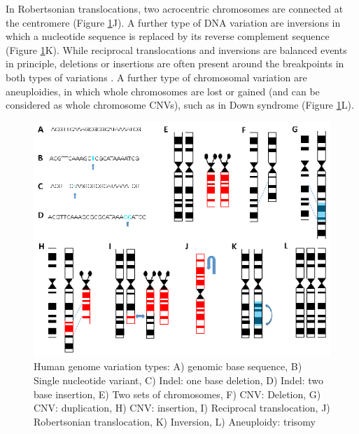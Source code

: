 In Robertsonian translocations, two acrocentric chromosomes are connected at the centromere \cite{Robertson_1916} (Figure \ref{fig:Introduction_Fig1}J). 
A further type of DNA variation are inversions in which a nucleotide sequence is replaced by its reverse complement sequence \cite{Sudmant_2015,den_Dunnen_2016} (Figure \ref{fig:Introduction_Fig1}K). 
While reciprocal translocations and inversions are balanced events in principle, deletions or insertions are often present around the breakpoints in both types of variations \cite{Sudmant_2015,Simioni_2017}. 
A further type of chromosomal variation are aneuploidies, in which whole chromosomes are lost or gained (and can be considered as whole chromosome CNVs), such as in Down syndrome (Figure \ref{fig:Introduction_Fig1}L).  


\begin{figure}[!ht]
	\includegraphics[width=1.0\linewidth]{img/Introduction_Fig1}
	\caption[Human genome variation]{Human genome variation types: A) genomic base sequence, B) Single nucleotide variant, C) Indel: one base deletion, D) Indel: two base insertion, E) Two sets of chromosomes, F) CNV: Deletion, G) CNV: duplication, H) CNV: insertion, I) Reciprocal translocation, J) Robertsonian translocation, K) Inversion, L) Aneuploidy: trisomy}
	\label{fig:Introduction_Fig1}
\end{figure}



